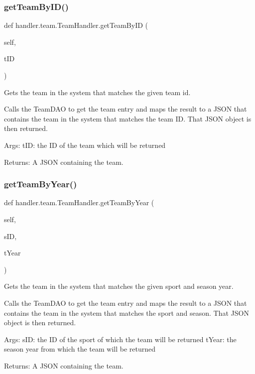 \subsubsection{\texorpdfstring{get\+Team\+By\+I\+D()}{getTeamByID()}}
{\footnotesize\ttfamily def handler.\+team.\+Team\+Handler.\+get\+Team\+By\+ID (\begin{DoxyParamCaption}\item[{}]{self,  }\item[{}]{t\+ID }\end{DoxyParamCaption})}

\begin{DoxyVerb}Gets the team in the system that matches the given team id.  

Calls the TeamDAO to get the team entry and maps the result
to a JSON that contains the team in the system that matches the team ID. 
That JSON object is then returned.

Args:
    tID: the ID of the team which will be returned
    
Returns:
    A JSON containing the team.
\end{DoxyVerb}
 \mbox{\label{classhandler_1_1team_1_1_team_handler_a4ee11f08a2e69e4a250527c9fea26190}} 
\subsubsection{\texorpdfstring{get\+Team\+By\+Year()}{getTeamByYear()}}
{\footnotesize\ttfamily def handler.\+team.\+Team\+Handler.\+get\+Team\+By\+Year (\begin{DoxyParamCaption}\item[{}]{self,  }\item[{}]{s\+ID,  }\item[{}]{t\+Year }\end{DoxyParamCaption})}

\begin{DoxyVerb}Gets the team in the system that matches the given sport and season year.  

Calls the TeamDAO to get the team entry and maps the result
to a JSON that contains the team in the system that matches the sport and season. 
That JSON object is then returned.

Args:
    sID: the ID of the sport of which the team will be returned
    tYear: the season year from which the team will be returned
    
Returns:
    A JSON containing the team.
\end{DoxyVerb}
 \mbox{\label{classhandler_1_1team_1_1_team_handler_a1a00f6d69828c15ce2da7b4215c868cf}} 
